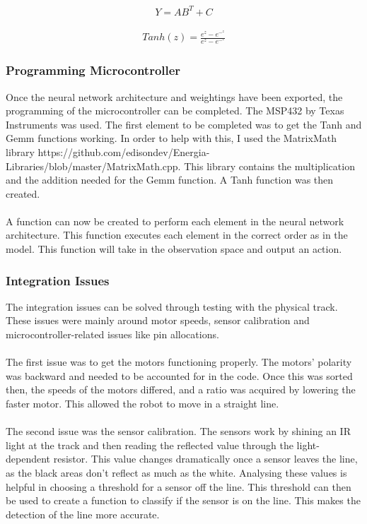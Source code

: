 \documentclass[a4paper,12pt]{article}
\begin{document}
\begin{equation}
\begin{aligned}
Y = AB^T + C
\end{aligned}
\end{equation}


\begin{equation}
\begin{aligned}
Tanh(z) = \frac{e^z-e^-^z}{e^z-e^-^z}
\end{aligned}
\end{equation}



\subsubsection{Programming Microcontroller}
Once the neural network architecture and weightings have been exported, the programming of the microcontroller can be completed. The MSP432 by Texas Instruments was used. The first element to be completed was to get the Tanh and Gemm functions working. In order to help with this, I used the MatrixMath library https://github.com/edisondev/Energia-Libraries/blob/master/MatrixMath.cpp. This library contains the multiplication and the addition needed for the Gemm function. A Tanh function was then created. 
\\\\
A function can now be created to perform each element in the neural network architecture. This function executes each element in the correct order as in the model. This function will take in the observation space and output an action. 


\subsubsection{Integration Issues}

The integration issues can be solved through testing with the physical track. These issues were mainly around motor speeds, sensor calibration and microcontroller-related issues like pin allocations. 
\\\\
The first issue was to get the motors functioning properly. The motors' polarity was backward and needed to be accounted for in the code. Once this was sorted then, the speeds of the motors differed, and a ratio was acquired by lowering the faster motor. This allowed the robot to move in a straight line. 
\\\\
The second issue was the sensor calibration. The sensors work by shining an IR light at the track and then reading the reflected value through the light-dependent resistor. This value changes dramatically once a sensor leaves the line, as the black areas don't reflect as much as the white. Analysing these values is helpful in choosing a threshold for a sensor off the line. This threshold can then be used to create a function to classify if the sensor is on the line. This makes the detection of the line more accurate. 
\end{document}
